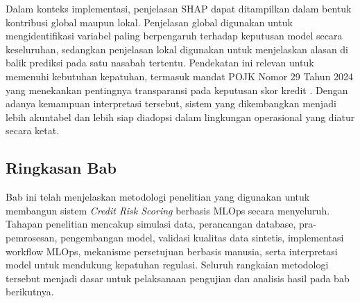 Dalam konteks implementasi, penjelasan SHAP dapat ditampilkan dalam bentuk kontribusi global maupun lokal. Penjelasan global digunakan untuk mengidentifikasi variabel paling berpengaruh terhadap keputusan model secara keseluruhan, sedangkan penjelasan lokal digunakan untuk menjelaskan alasan di balik prediksi pada satu nasabah tertentu. Pendekatan ini relevan untuk memenuhi kebutuhan kepatuhan, termasuk mandat POJK Nomor 29 Tahun 2024 yang menekankan pentingnya transparansi pada keputusan skor kredit \cite{ojk2024pojk29}. Dengan adanya kemampuan interpretasi tersebut, sistem yang dikembangkan menjadi lebih akuntabel dan lebih siap diadopsi dalam lingkungan operasional yang diatur secara ketat.

\subsection{Ringkasan Bab}
Bab ini telah menjelaskan metodologi penelitian yang digunakan untuk membangun sistem \textit{Credit Risk Scoring} berbasis MLOps secara menyeluruh. Tahapan penelitian mencakup simulasi data, perancangan database, pra-pemrosesan, pengembangan model, validasi kualitas data sintetis, implementasi workflow MLOps, mekanisme persetujuan berbasis manusia, serta interpretasi model untuk mendukung kepatuhan regulasi. Seluruh rangkaian metodologi tersebut menjadi dasar untuk pelaksanaan pengujian dan analisis hasil pada bab berikutnya.